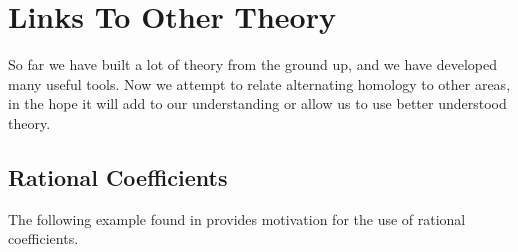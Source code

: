 \documentclass[11pt,a4paper,twoside]{article}
\theoremstyle{plain}
\theoremstyle{definition}
\theoremstyle{definition}
\theoremstyle{definition}
\theoremstyle{definition}
\theoremstyle{definition}
\begin{document}
\pagebreak
\setcounter{thm}{0}
\section{Links To Other Theory} \label{Sec:LinksToOtherTheory}
So far we have built a lot of theory from the ground up, and we have developed many useful tools. Now we attempt to relate alternating homology to other areas, in the hope it will add to our understanding or allow us to use better understood theory.

\subsection{Rational Coefficients}\label{Sec:RationalCoefficients}
The following example found in \cite{HoustonSingularityTheory} provides motivation for the use of rational coefficients.
\end{document}
